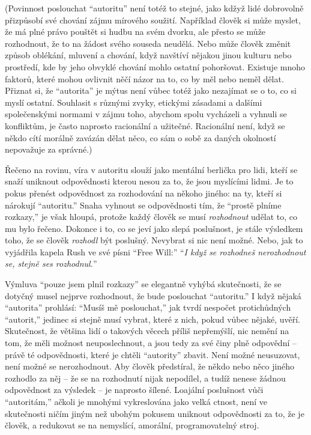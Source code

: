 \documentclass{book}
\begin{document}
(Povinnost poslouchat \enquote{autoritu} není totéž to stejné, jako kdžyž lidé dobrovolně přizpůsobí své chování zájmu mírového soužití. Například člověk si může myslet, že má plné právo pouštět si hudbu na svém dvorku, ale přesto se může rozhodnout, že to na žádost svého souseda neudělá. Nebo může člověk změnit způsob oblékání, mluvení a chování, když navštíví nějakou jinou kulturu nebo prostředí, kde by jeho obvyklé chování mohlo ostatní pohoršovat. Existuje mnoho faktorů, které mohou ovlivnit něčí názor na to, co by měl nebo neměl dělat. Přiznat si, že \enquote{autorita} je mýtus není vůbec totéž jako nezajímat se o to, co si myslí ostatní. Souhlasit s různými zvyky, etickými zásadami a dalšími společenskými normami v zájmu toho, abychom spolu vycházeli a vyhnuli se konfliktům, je často naprosto racionální a užitečné. Racionální není, když se někdo cítí morálně zavázán dělat něco, co sám o sobě za daných okolností nepovažuje za správné.)

Řečeno na rovinu, víra v autoritu slouží jako mentální berlička pro lidi, kteří se snaží uniknout odpovědnosti kterou nesou za to, že jsou myslícími lidmi. Je to pokus přenést odpovědnost za rozhodování na někoho jiného: na ty, kteří si nárokují \enquote{autoritu.} Snaha vyhnout se odpovědnosti tím, že \enquote{prostě plníme rozkazy,} je však hloupá, protože každý člověk se musí \emph{rozhodnout} udělat to, co mu bylo řečeno. Dokonce i to, co se jeví jako slepá poslušnost, je stále výsledkem toho, že se člověk \emph{rozhodl} být poslušný. Nevybrat si nic není možné. Nebo, jak to vyjádřila kapela Rush ve své písni \enquote{Free Will:} \enquote{\emph{I když se rozhodneš nerozhodnout se, stejně ses rozhodnul.}}

Výmluva \enquote{pouze jsem plnil rozkazy} se elegantně vyhýbá skutečnosti, že se dotyčný musel nejprve rozhodnout, že bude poslouchat \enquote{autoritu.} I když nějaká \enquote{autorita} prohlásí: \enquote{Musíš mě poslouchat,} jak tvrdí nespočet protichůdných \enquote{autorit,} jedinec si stejně musí vybrat, které z nich, pokud vůbec nějaké, uvěří. Skutečnost, že většina lidí o takových věcech příliš nepřemýšlí, nic nemění na tom, že měli možnost neuposlechnout, a jsou tedy za své činy plně odpovědní -- právě té odpovědnosti, které je chtěli \enquote{autority} zbavit. Není možné neusuzovat, není možné se nerozhodnout. Aby člověk předstíral, že někdo nebo něco jiného rozhodlo za něj -- že se na rozhodnutí nijak nepodílel, a tudíž nenese žádnou odpovědnost za výsledek -- je naprosto šílené. Loajální poslušnost vůči \enquote{autoritám,} ačkoli je mnohými vykreslována jako velká ctnost, není ve skutečnosti ničím jiným než ubohým pokusem uniknout odpovědnosti za to, že je člověk, a redukovat se na nemyslící, amorální, programovatelný stroj.
\end{document}
